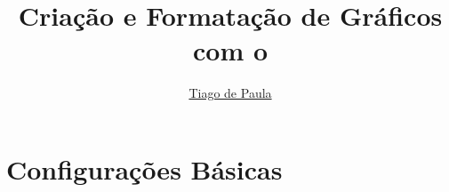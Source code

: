 \documentclass{article}
\title{Criação e Formatação de Gráficos com o}\softwarelogo
\author{\href{mailto:t187679@dac.unicamp.br}{Tiago de Paula}}
\date{}
\begin{document}
    \maketitle

    \section{Configurações Básicas} \label{sec:basico}
        







\end{document}
